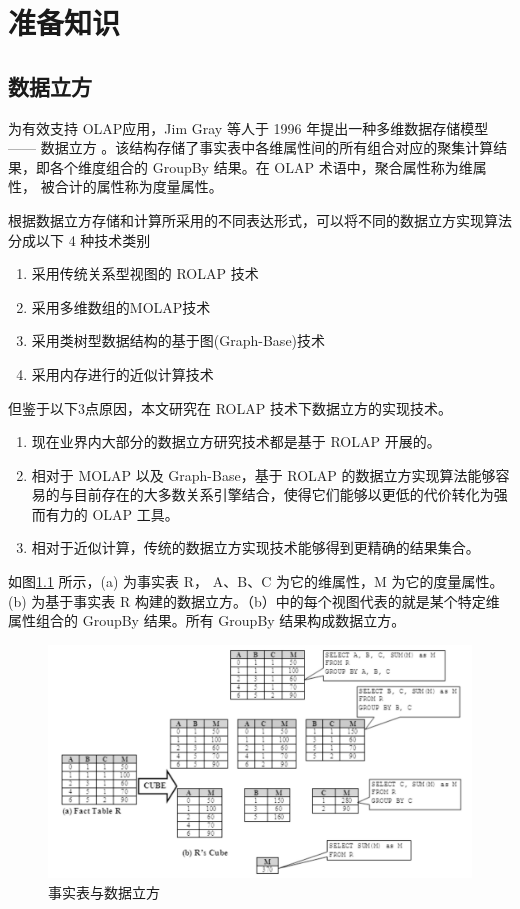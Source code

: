 \chapter{准备知识}

\section{数据立方}
为有效支持 OLAP应用，Jim Gray 等人于 1996 年提出一种多维数据存储模型 —— 数据立方 \cite{gray1997data}。该结构存储了事实表中各维属性间的所有组合对应的聚集计算结果，即各个维度组合的 GroupBy 结果。在 OLAP 术语中，聚合属性称为维属性， 被合计的属性称为度量属性。

根据数据立方存储和计算所采用的不同表达形式，可以将不同的数据立方实现算法分成以下 4 种技术类别
\begin{enumerate}
\item 采用传统关系型视图的 ROLAP 技术 \cite{morfonios2007rolap}
\item 采用多维数组的MOLAP技术 \cite{zhao1997array}
\item 采用类树型数据结构的基于图(Graph-Base)技术 \cite{zhao2011graph}
\item 采用内存进行的近似计算技术 \cite{kamatdistributed}
\end{enumerate}

但鉴于以下3点原因，本文研究在 ROLAP 技术下数据立方的实现技术。
\begin{enumerate}
\item 现在业界内大部分的数据立方研究技术都是基于 ROLAP 开展的。
\item 相对于 MOLAP 以及 Graph-Base，基于 ROLAP 的数据立方实现算法能够容易的与目前存在的大多数关系引擎结合，使得它们能够以更低的代价转化为强而有力的 OLAP 工具。
\item 相对于近似计算，传统的数据立方实现技术能够得到更精确的结果集合。
\end{enumerate}

如图\ref{fact_table_data_cube} 所示，(a) 为事实表 R， A、B、C 为它的维属性，M 为它的度量属性。(b) 为基于事实表 R 构建的数据立方。（b）中的每个视图代表的就是某个特定维属性组合的 GroupBy 结果。所有 GroupBy 结果构成数据立方。

\begin{figure}[!htb]
\centering\includegraphics[width=6in]{picture/ch_preliminary/fact_table_data_cube} 
\caption{事实表与数据立方}\label{fact_table_data_cube} 
\end{figure} 

